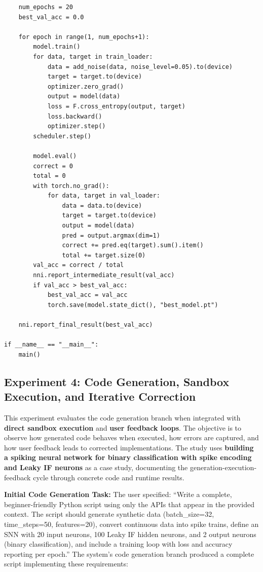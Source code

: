 \begin{lstlisting}
    num_epochs = 20
    best_val_acc = 0.0

    for epoch in range(1, num_epochs+1):
        model.train()
        for data, target in train_loader:
            data = add_noise(data, noise_level=0.05).to(device)
            target = target.to(device)
            optimizer.zero_grad()
            output = model(data)
            loss = F.cross_entropy(output, target)
            loss.backward()
            optimizer.step()
        scheduler.step()

        model.eval()
        correct = 0
        total = 0
        with torch.no_grad():
            for data, target in val_loader:
                data = data.to(device)
                target = target.to(device)
                output = model(data)
                pred = output.argmax(dim=1)
                correct += pred.eq(target).sum().item()
                total += target.size(0)
        val_acc = correct / total
        nni.report_intermediate_result(val_acc)
        if val_acc > best_val_acc:
            best_val_acc = val_acc
            torch.save(model.state_dict(), "best_model.pt")

    nni.report_final_result(best_val_acc)

if __name__ == "__main__":
    main()
\end{lstlisting}




\subsection{Experiment 4: Code Generation, Sandbox Execution, and Iterative Correction}

This experiment evaluates the code generation branch when integrated with \textbf{direct sandbox execution} and \textbf{user feedback loops}. The objective is to observe how generated code behaves when executed, how errors are captured, and how user feedback leads to corrected implementations. The study uses \textbf{building a spiking neural network for binary classification with spike encoding and Leaky IF neurons} as a case study, documenting the generation-execution-feedback cycle through concrete code and runtime results.

\vspace{0.3cm}

\noindent \textbf{Initial Code Generation Task:} The user specified: ``Write a complete, beginner-friendly Python script using only the APIs that appear in the provided context. The script should generate synthetic data (batch\_size=32, time\_steps=50, features=20), convert continuous data into spike trains, define an SNN with 20 input neurons, 100 Leaky IF hidden neurons, and 2 output neurons (binary classification), and include a training loop with loss and accuracy reporting per epoch.'' The system's code generation branch produced a complete script implementing these requirements:

